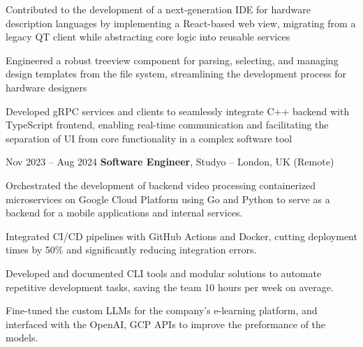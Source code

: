 \vspace{0.10 cm}
\begin{onecolentry}
    \begin{highlights}
        \item Contributed to the development of a next-generation IDE for hardware description languages by implementing a React-based web view, migrating from a legacy QT client while abstracting core logic into reusable services

        \item Engineered a robust treeview component for parsing, selecting, and managing design templates from the file system, streamlining the development process for hardware designers
        \item Developed gRPC services and clients to seamlessly integrate C++ backend with TypeScript frontend, enabling real-time communication and facilitating the separation of UI from core functionality in a complex software tool

    \end{highlights}
\end{onecolentry}


\vspace{0.4 cm}

\begin{twocolentry}{
        Nov 2023 – Aug 2024
    }
    \textbf{Software Engineer}, Studyo -- London, UK (Remote)\end{twocolentry}

\vspace{0.10 cm}
\begin{onecolentry}
    \begin{highlights}
        \item Orchestrated the development of backend video processing containerized microservices on Google Cloud Platform using Go and Python to serve as a backend for a mobile applications and internal services.
        \item Integrated CI/CD pipelines with GitHub Actions and Docker, cutting deployment times by 50\% and significantly reducing integration errors.
        \item Developed and documented CLI tools and modular solutions to automate repetitive development tasks, saving the team 10 hours per week on average.
        \item Fine-tuned the custom LLMs for the company's e-learning platform, and interfaced with the OpenAI, GCP APIs to improve the preformance of the models.
    \end{highlights}
\end{onecolentry}

